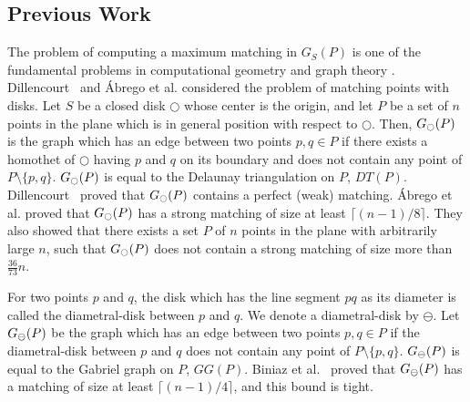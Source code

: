 \documentclass[11pt,a4paper]{article}
\newcommand{\G}[2]{G_{#1}({#2})}
\newcommand{\disc}{\Circle}
\newcommand{\discs}{\scriptsize \Circle}
\newcommand{\ddisc}{\ominus}
\newcommand{\ddiscs}{\scriptsize \ominus}
\begin{document}
\subsection{Previous Work}
\label{previous-work}
The problem of computing a maximum matching in $\G{S}{P}$ is one of the fundamental problems in computational geometry and graph theory \cite{Abrego2004, Abrego2009, Babu2014, Bereg2009, Biniaz2014, Biniaz2015, Dillencourt1990}. 
Dillencourt~\cite{Dillencourt1990} and \'{A}brego et al. \cite{Abrego2004} considered the problem of matching points with disks. Let $S$ be a closed disk $\disc$ whose center is the origin, and let $P$ be a set of $n$ points in the plane which is in general position with respect to $\disc$. Then, $\G{\discs}{P}$ is the graph which has an edge between two points $p,q\in P$ if there exists a homothet of $\disc$ having $p$ and $q$ on its boundary and does not contain any point of $P\setminus\{p,q\}$. $\G{\discs}{P}$ is equal to the Delaunay triangulation on $P$, $DT(P)$. Dillencourt~\cite{Dillencourt1990} proved that $\G{\discs}{P}$ contains a perfect (weak) matching. \'{A}brego et al. \cite{Abrego2004} proved that $\G{\discs}{P}$ has a strong matching of size at least $\lceil(n-1)/8\rceil$. They also showed that there exists a set $P$ of $n$ points in the plane with arbitrarily large $n$, such that $\G{\discs}{P}$ does not contain a strong matching of size more than $\frac{36}{73}n$.

For two points $p$ and $q$, the disk which has the line segment $pq$ as its diameter is called the diametral-disk between $p$ and $q$. We denote a diametral-disk by $\ddisc$. Let $\G{\ddiscs}{P}$ be the graph which has an edge between two points $p,q\in P$ if the diametral-disk between $p$ and $q$ does not contain any point of $P\setminus\{p,q\}$. $\G{\ddiscs}{P}$ is equal to the Gabriel graph on $P$, $GG(P)$. Biniaz et al.~\cite{Biniaz2014} proved that $\G{\ddiscs}{P}$ has a matching of size at least $\lceil(n-1)/4\rceil$, and this bound is tight.
\end{document}
